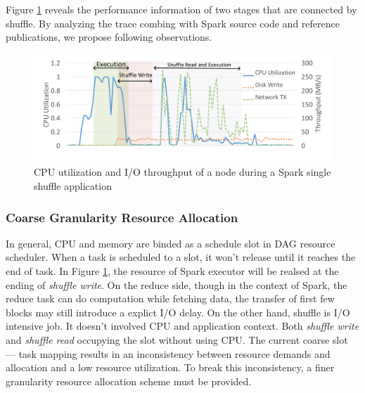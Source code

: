 Figure \ref{fig:util} reveals the performance information of two stages that are connected by shuffle. By analyzing the trace combing with Spark source code\cite{} and reference publications, we propose following observations. 

\begin{figure}
	\includegraphics[width=\linewidth]{fig/util}
	\caption{CPU utilization and I/O throughput of a node during a Spark single shuffle application}
	\label{fig:util}
\end{figure}

\subsubsection{Coarse Granularity Resource Allocation}
In general, CPU and memory are binded as a schedule slot in DAG resource scheduler. When a task is scheduled to a slot, it won't release until it reaches the end of task. In Figure \ref{fig:util}, the resource of Spark executor will be realsed at the ending of \textit{shuffle write}. On the reduce side, though in the context of Spark, the reduce task can do computation while fetching data, the transfer of first few blocks may still introduce a explict I/O delay. On the other hand, shuffle is I/O intensive job. It doesn't involved CPU and application context. Both \textit{shuffle write} and \textit{shuffle read} occupying the slot without using CPU. The current coarse slot --- task mapping results in an inconsistency between resource demands and allocation and a low resource utilization. To break this inconsistency, a finer granularity resource allocation scheme must be provided.

